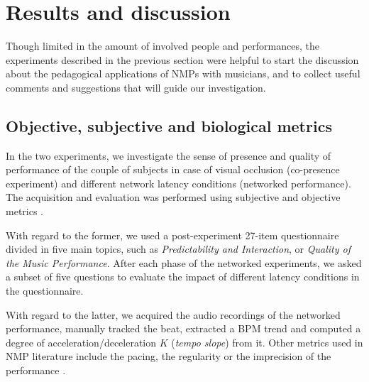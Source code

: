 \section{Results and discussion}\label{sec:discussion}
Though limited in the amount of involved people and performances, the experiments described in the previous section were helpful to start the discussion about the pedagogical applications of NMPs with musicians, and to collect useful comments and suggestions that will guide our investigation. 

\subsection{Objective, subjective and biological metrics}\label{subsec:metrics}
In the two experiments, we investigate the sense of presence and quality of performance of the couple of subjects in case of visual occlusion (co-presence experiment) and different network latency conditions (networked performance). The acquisition and evaluation was performed using subjective and objective metrics \cite{CIM2018}. 

With regard to the former, we used a post-experiment 27-item questionnaire divided in five main topics, such as \textit{Predictability and Interaction}, or \textit{Quality of the Music Performance}. After each phase of the networked experiments, we asked a subset of five questions to evaluate the impact of different latency conditions in the questionnaire.

With regard to the latter, we acquired the audio recordings of the networked performance, manually tracked the beat, extracted a BPM trend and computed a degree of acceleration/deceleration $K$  (\textit{tempo slope}) from it. Other metrics used in NMP literature include the pacing, the regularity or the imprecision of the performance \cite{RottondiOverview}.



